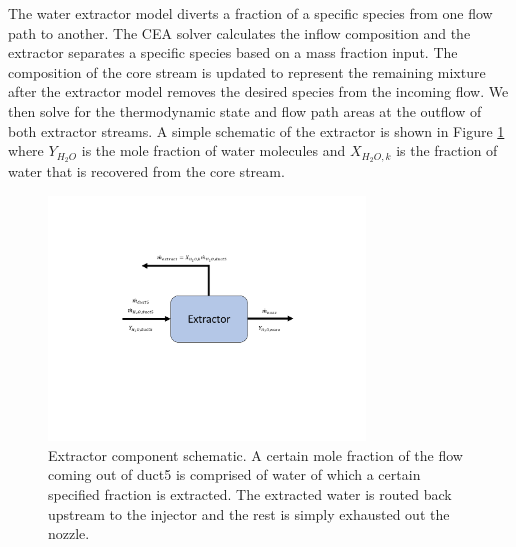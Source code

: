 \documentclass[conf]{new-aiaa}
\begin{document}
The water extractor model diverts a fraction of a specific species from one flow path to another.
The CEA solver calculates the inflow composition and the extractor separates a specific species based on a mass fraction input.
The composition of the core stream is updated to represent the remaining mixture after the extractor model removes the desired species from the incoming flow.
We then solve for the thermodynamic state and flow path areas at the outflow of both extractor streams.
A simple schematic of the extractor is shown in Figure \ref{fig:extractor} where $Y_{H_2O}$ is the mole fraction of water molecules and $X_{H_2O,k}$ is the fraction of water that is recovered from the core stream.

\begin{figure}[hbt!]
    \centering
    \includegraphics[width=0.75\textwidth]{extractor.pdf}
    \caption{
        Extractor component schematic.
        A certain mole fraction of the flow coming out of duct5 is comprised of water of which a certain specified fraction is extracted.
        The extracted water is routed back upstream to the injector and the rest is simply exhausted out the nozzle.
    }
    \label{fig:extractor}
\end{figure}
\end{document}
